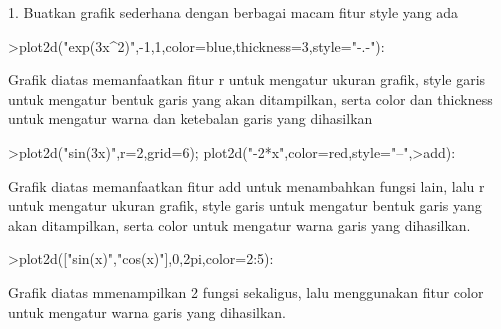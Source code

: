 \documentclass{article}
\begin{document}
\begin{eulernotebook}
\begin{eulercomment}
\begin{eulercomment}
\begin{eulercomment}
\begin{eulercomment}
\begin{eulercomment}
\begin{eulercomment}
\begin{eulercomment}
1. Buatkan grafik sederhana dengan berbagai macam fitur style yang ada
\end{eulercomment}
\begin{eulerprompt}
>plot2d("exp(3x^2)",-1,1,color=blue,thickness=3,style="-.-"):
\end{eulerprompt}
\begin{eulercomment}
Grafik diatas memanfaatkan fitur r untuk mengatur ukuran grafik, style
garis untuk mengatur bentuk garis yang akan ditampilkan, serta color
dan thickness untuk mengatur warna dan ketebalan garis yang dihasilkan
\end{eulercomment}
\begin{eulerprompt}
>plot2d("sin(3x)",r=2,grid=6); plot2d("-2*x",color=red,style="--",>add):
\end{eulerprompt}
\begin{eulercomment}
Grafik diatas memanfaatkan fitur add untuk menambahkan fungsi lain,
lalu r untuk mengatur ukuran grafik, style garis untuk mengatur bentuk
garis yang akan ditampilkan, serta color untuk mengatur warna garis
yang dihasilkan.
\end{eulercomment}
\begin{eulerprompt}
>plot2d(["sin(x)","cos(x)"],0,2pi,color=2:5):
\end{eulerprompt}
\begin{eulercomment}
Grafik diatas mmenampilkan 2 fungsi sekaligus, lalu menggunakan fitur
color untuk mengatur warna garis yang dihasilkan.


\end{eulercomment}
\end{eulercomment}
\end{eulercomment}
\end{eulercomment}
\end{eulercomment}
\end{eulercomment}
\end{eulercomment}
\end{eulernotebook}
\end{document}
